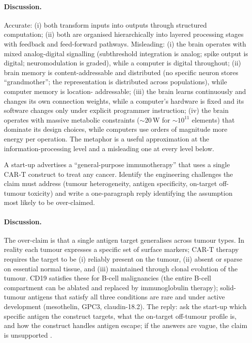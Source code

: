 \paragraph{Discussion.}
Accurate: (i) both transform inputs into outputs through structured
computation; (ii) both are organised hierarchically into layered
processing stages with feedback and feed-forward pathways. Misleading:
(i) the brain operates with mixed analog-digital signalling
(subthreshold integration is analog; spike output is digital;
neuromodulation is graded), while a computer is digital throughout;
(ii) brain memory is content-addressable and distributed (no
specific neuron stores ``grandmother''; the representation is
distributed across populations), while computer memory is location-
addressable; (iii) the brain learns continuously and changes its
own connection weights, while a computer's hardware is fixed and
its software changes only under explicit programmer instruction;
(iv) the brain operates with massive metabolic constraints
($\sim 20\,\text{W}$ for $\sim 10^{11}$ elements) that dominate its
design choices, while computers use orders of magnitude more energy
per operation. The metaphor is a useful approximation at the
information-processing level and a misleading one at every level
below.

\begin{exercise}
A start-up advertises a ``general-purpose immunotherapy'' that uses
a single CAR-T construct to treat any cancer. Identify the engineering
challenges the claim must address (tumour heterogeneity, antigen
specificity, on-target off-tumour toxicity) and write a one-paragraph
reply identifying the assumption most likely to be over-claimed.
\end{exercise}

\paragraph{Discussion.}
The over-claim is that a single antigen target generalises across
tumour types. In reality each tumour expresses a specific set of
surface markers; CAR-T therapy requires the target to be (i) reliably
present on the tumour, (ii) absent or sparse on essential normal
tissue, and (iii) maintained through clonal evolution of the tumour.
CD19 satisfies these for B-cell malignancies (the entire B-cell
compartment can be ablated and replaced by immunoglobulin therapy);
solid-tumour antigens that satisfy all three conditions are rare and
under active development (mesothelin, GPC3, claudin-18.2). The reply:
ask the start-up which specific antigen the construct targets, what
the on-target off-tumour profile is, and how the construct handles
antigen escape; if the answers are vague, the claim is unsupported
\cite{paper:v6c07-june-cart-2018}.

